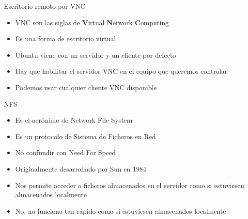 \documentclass[spanish]{beamer}
\begin{document}
\begin{frame}{Escritorio remoto por VNC}
\begin{itemize}
\item VNC son las siglas de {\bf V}irtual {\bf N}etwork {\bf C}omputing
\item Es una forma de escritorio virtual
\item Ubuntu viene con un servidor y un cliente por defecto
\item Hay que habilitar el servidor VNC en el equipo que queremos controlar
\item Podemos usar cualquier cliente VNC disponible
\end{itemize}
\end{frame}

\begin{frame}{NFS}
\begin{itemize}
\item Es el acrónimo de Network File System
\item Es un protocolo de Sistema de Ficheros en Red 
\item No confundir con Need For Speed
\item Originalmente desarrollado por Sun en 1984
\item Nos permite acceder a ficheros almacenados en el servidor como si 
estuviesen almacenados localmente
\item No, no funciona tan rápido como si estuviesen almacenados localmente
\end{itemize}
\end{frame}
\end{document}
